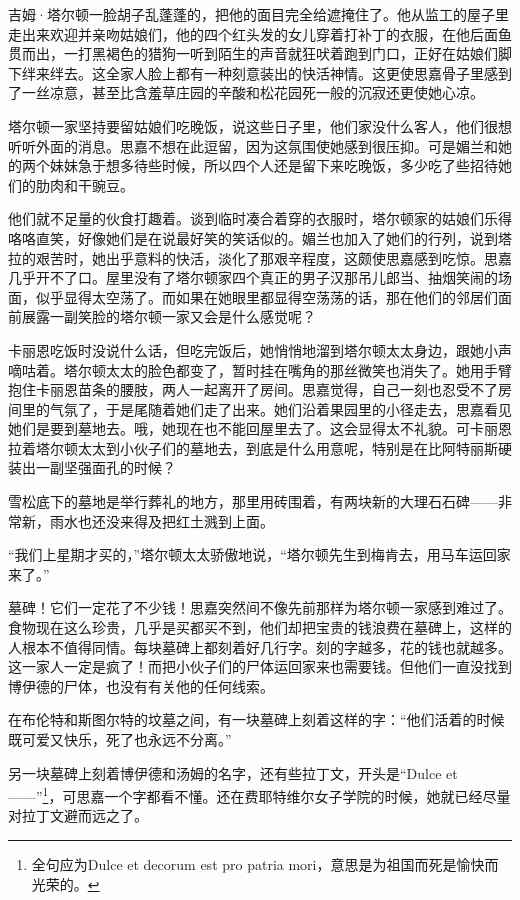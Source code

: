 \par 吉姆·塔尔顿一脸胡子乱蓬蓬的，把他的面目完全给遮掩住了。他从监工的屋子里走出来欢迎并亲吻姑娘们，他的四个红头发的女儿穿着打补丁的衣服，在他后面鱼贯而出，一打黑褐色的猎狗一听到陌生的声音就狂吠着跑到门口，正好在姑娘们脚下绊来绊去。这全家人脸上都有一种刻意装出的快活神情。这更使思嘉骨子里感到了一丝凉意，甚至比含羞草庄园的辛酸和松花园死一般的沉寂还更使她心凉。
\par 塔尔顿一家坚持要留姑娘们吃晚饭，说这些日子里，他们家没什么客人，他们很想听听外面的消息。思嘉不想在此逗留，因为这氛围使她感到很压抑。可是媚兰和她的两个妹妹急于想多待些时候，所以四个人还是留下来吃晚饭，多少吃了些招待她们的肋肉和干豌豆。
\par 他们就不足量的伙食打趣着。谈到临时凑合着穿的衣服时，塔尔顿家的姑娘们乐得咯咯直笑，好像她们是在说最好笑的笑话似的。媚兰也加入了她们的行列，说到塔拉的艰苦时，她出乎意料的快活，淡化了那艰辛程度，这颇使思嘉感到吃惊。思嘉几乎开不了口。屋里没有了塔尔顿家四个真正的男子汉那吊儿郎当、抽烟笑闹的场面，似乎显得太空荡了。而如果在她眼里都显得空荡荡的话，那在他们的邻居们面前展露一副笑脸的塔尔顿一家又会是什么感觉呢？
\par 卡丽恩吃饭时没说什么话，但吃完饭后，她悄悄地溜到塔尔顿太太身边，跟她小声嘀咕着。塔尔顿太太的脸色都变了，暂时挂在嘴角的那丝微笑也消失了。她用手臂抱住卡丽恩苗条的腰肢，两人一起离开了房间。思嘉觉得，自己一刻也忍受不了房间里的气氛了，于是尾随着她们走了出来。她们沿着果园里的小径走去，思嘉看见她们是要到墓地去。哦，她现在也不能回屋里去了。这会显得太不礼貌。可卡丽恩拉着塔尔顿太太到小伙子们的墓地去，到底是什么用意呢，特别是在比阿特丽斯硬装出一副坚强面孔的时候？
\par 雪松底下的墓地是举行葬礼的地方，那里用砖围着，有两块新的大理石石碑——非常新，雨水也还没来得及把红土溅到上面。
\par “我们上星期才买的，”塔尔顿太太骄傲地说，“塔尔顿先生到梅肯去，用马车运回家来了。”
\par 墓碑！它们一定花了不少钱！思嘉突然间不像先前那样为塔尔顿一家感到难过了。食物现在这么珍贵，几乎是买都买不到，他们却把宝贵的钱浪费在墓碑上，这样的人根本不值得同情。每块墓碑上都刻着好几行字。刻的字越多，花的钱也就越多。这一家人一定是疯了！而把小伙子们的尸体运回家来也需要钱。但他们一直没找到博伊德的尸体，也没有有关他的任何线索。
\par 在布伦特和斯图尔特的坟墓之间，有一块墓碑上刻着这样的字：“他们活着的时候既可爱又快乐，死了也永远不分离。”
\par 另一块墓碑上刻着博伊德和汤姆的名字，还有些拉丁文，开头是“Dulce et——”\footnote{全句应为Dulce et decorum est pro patria mori，意思是为祖国而死是愉快而光荣的。}，可思嘉一个字都看不懂。还在费耶特维尔女子学院的时候，她就已经尽量对拉丁文避而远之了。
